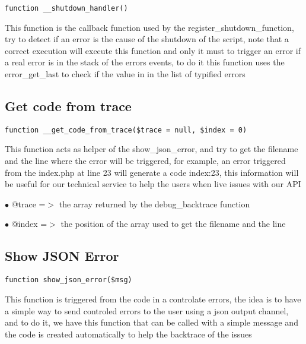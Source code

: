 \documentclass[a4paper]{book}
\begin{document}
\begin{lstlisting}
function __shutdown_handler()
\end{lstlisting}

This function is the callback function used by the register\_shutdown\_function, try to
detect if an error is the cause of the shutdown of the script, note that a correct
execution will execute this function and only it must to trigger an error if a real
error is in the stack of the errors events, to do it this function uses the error\_get\_last
to check if the value in in the list of typified errors

\hypertarget{toc110}{}
\subsection{Get code from trace}

\begin{lstlisting}
function __get_code_from_trace($trace = null, $index = 0)
\end{lstlisting}

This function acts as helper of the show\_json\_error, and try to get the filename and the line
where the error will be triggered, for example, an error triggered from the index.php at line
23 will generate a code index:23, this information will be useful for our technical service
to help the users when live issues with our API

\begin{compactitem}
\item[\color{myblue}$\bullet$] @trace =$>$ the array returned by the debug\_backtrace function
\item[\color{myblue}$\bullet$] @index =$>$ the position of the array used to get the filename and the line
\end{compactitem}

\hypertarget{toc111}{}
\subsection{Show JSON Error}

\begin{lstlisting}
function show_json_error($msg)
\end{lstlisting}

This function is triggered from the code in a controlate errors, the idea is to have
a simple way to send controled errors to the user using a json output channel, and to
do it, we have this function that can be called with a simple message and the code
is created automatically to help the backtrace of the issues
\end{document}
